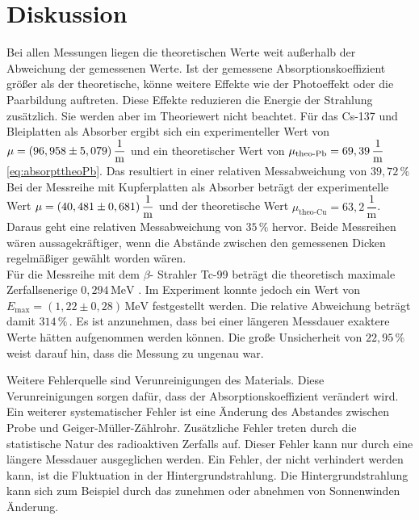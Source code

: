 \section{Diskussion}
\label{sec:Diskussion}

Bei allen Messungen liegen die theoretischen Werte weit außerhalb der Abweichung der gemessenen Werte. Ist der gemessene Absorptionskoeffizient größer als der theoretische, könne weitere Effekte wie der Photoeffekt oder die Paarbildung auftreten.
Diese Effekte reduzieren die Energie der Strahlung zusätzlich. Sie werden aber im Theoriewert nicht beachtet.
Für das Cs-137 und Bleiplatten als Absorber ergibt sich ein experimenteller Wert von $ \mu = \left( 96,958 \pm 5,079 \right) \unit{\dfrac{1}{\meter}} $ und ein theoretischer Wert von $\mu_{\text{theo-Pb}} =  69,39 \, \unit{\dfrac{1}{\meter}} $ \eqref{eq:absorpttheoPb}.
Das resultiert in einer relativen Messabweichung von $ 39,72 \, \%$
Bei der Messreihe mit Kupferplatten als Absorber beträgt der experimentelle Wert $\mu =  \left( 40,481 \pm 0,681 \right) \unit{\dfrac{1}{\meter}}$ und der theoretische Wert $\mu_{\text{theo-Cu}} = 63,2  \, \dfrac{1}{\unit{\meter}}$. Daraus geht eine relativen Messabweichung von $ 35 \, \%$  hervor.
Beide Messreihen wären aussagekräftiger, wenn die Abstände zwischen den gemessenen Dicken regelmäßiger gewählt worden wären. \\


Für die Messreihe mit dem $ \beta $- Strahler Tc-99 beträgt die theoretisch maximale Zerfallsenerige $ 	0,294  \, \unit{\mega\eV} $ \cite{ap05}. Im Experiment konnte jedoch ein Wert von $E_\text{max} = \left(1,22 \pm 0,28 \right) \, \unit{\mega\eV}$ festgestellt werden. 
Die relative Abweichung beträgt damit $ 314 \, \% \,.$ Es ist anzunehmen, dass bei einer längeren Messdauer exaktere Werte hätten aufgenommen werden können. Die große Unsicherheit von $ 22,95 \, \%$ weist darauf hin, dass die Messung zu ungenau war.

Weitere Fehlerquelle sind Verunreinigungen des Materials. Diese Verunreinigungen sorgen dafür, dass der Absorptionskoeffizient verändert wird.
Ein weiterer systematischer Fehler ist eine Änderung des Abstandes zwischen Probe und Geiger-Müller-Zählrohr.
Zusätzliche Fehler treten durch die statistische Natur des radioaktiven Zerfalls auf. Dieser Fehler kann nur durch eine längere Messdauer ausgeglichen werden.
Ein Fehler, der nicht verhindert werden kann, ist die Fluktuation in der Hintergrundstrahlung.
Die Hintergrundstrahlung kann sich zum Beispiel durch das zunehmen oder abnehmen von Sonnenwinden Änderung.